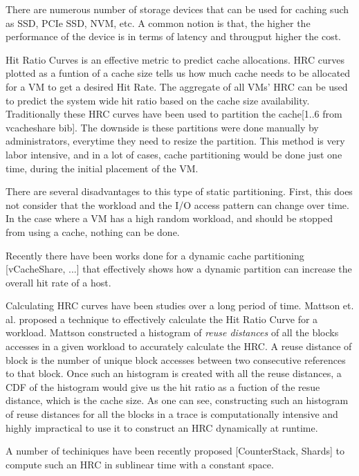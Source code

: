 
There are numerous number of storage devices that can be used for caching such as SSD, PCIe SSD, NVM, etc. A common notion is that, the higher the performance of the device is in terms of latency and througput higher the cost.

Hit Ratio Curves is an effective metric to predict cache allocations. HRC curves plotted as a funtion of a cache size tells us how much cache needs to be allocated for a VM to get a desired Hit Rate. The aggregate of all VMs' HRC can be used to predict the system wide hit ratio based on the cache size availability. Traditionally these HRC curves have been used to partition the cache[1..6 from vcacheshare bib]. The downside is these partitions were done manually by administrators, everytime they need to resize the partition. This method is very labor intensive, and in a lot of cases, cache partitioning would be done just one time, during the initial placement of the VM.

There are several disadvantages to this type of static partitioning. First, this does not consider that the workload and the I/O access pattern can change over time. In the case where a VM has a high random workload, and should be stopped from using a cache, nothing can be done.

Recently there have been works done for a dynamic cache partitioning [vCacheShare, ...] that effectively shows how a dynamic partition can increase the overall hit rate of a host.

Calculating HRC curves have been studies over a long period of time. Mattson et. al. proposed a technique to effectively calculate the Hit Ratio Curve for a workload. Mattson constructed a histogram of \emph{reuse distances} of all the blocks accesses in a given workload to accurately calculate the HRC. A reuse distance of block is the number of unique block accesses between two consecutive references to that block. Once such an histogram is created with all the reuse distances, a CDF of the histogram would give us the hit ratio as a fuction of the resue distance, which is the cache size. As one can see, constructing such an histogram of reuse distances for all the blocks in a trace is computationally intensive and highly impractical to use it to construct an HRC dynamically at runtime. 

A number of techiniques have been recently proposed [CounterStack, Shards] to compute such an HRC in sublinear time with a constant space. 
